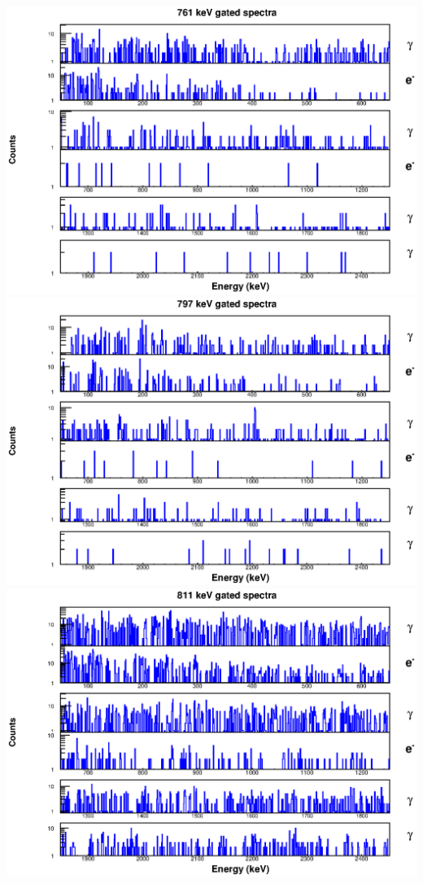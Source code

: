 \includegraphics[scale=0.8]{154Gd_Appendix/761_combined.eps}
\includegraphics[scale=0.8]{154Gd_Appendix/797_combined.eps}
\includegraphics[scale=0.8]{154Gd_Appendix/811_combined.eps}
